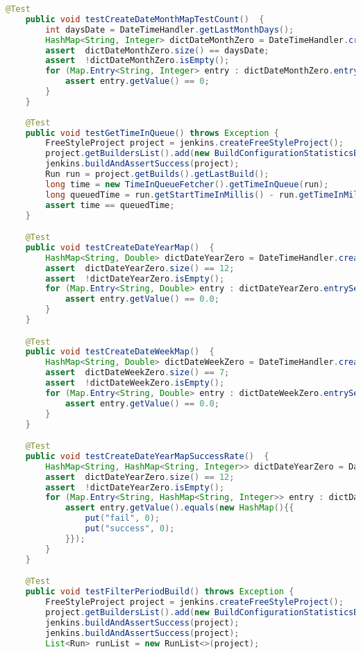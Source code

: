 \begin{lstlisting}[language=Java]
    @Test
    public void testCreateDateMonthMapTestCount()  {
        int daysDate = DateTimeHandler.getLastMonthDays();
        HashMap<String, Integer> dictDateMonthZero = DateTimeHandler.createDateMonthMapTestCount();
        assert  dictDateMonthZero.size() == daysDate;
        assert  !dictDateMonthZero.isEmpty();
        for (Map.Entry<String, Integer> entry : dictDateMonthZero.entrySet()) {
            assert entry.getValue() == 0;
        }
    }
    
    @Test
    public void testGetTimeInQueue() throws Exception {
        FreeStyleProject project = jenkins.createFreeStyleProject();
        project.getBuildersList().add(new BuildConfigurationStatisticsBuilder());
        jenkins.buildAndAssertSuccess(project);
        Run run = project.getBuilds().getLastBuild();
        long time = new TimeInQueueFetcher().getTimeInQueue(run);
        long queuedTime = run.getStartTimeInMillis() - run.getTimeInMillis();
        assert time == queuedTime;
    }

    @Test
    public void testCreateDateYearMap()  {
        HashMap<String, Double> dictDateYearZero = DateTimeHandler.createDateYearMap();
        assert  dictDateYearZero.size() == 12;
        assert  !dictDateYearZero.isEmpty();
        for (Map.Entry<String, Double> entry : dictDateYearZero.entrySet()) {
            assert entry.getValue() == 0.0;
        }
    }

    @Test
    public void testCreateDateWeekMap()  {
        HashMap<String, Double> dictDateWeekZero = DateTimeHandler.createDateWeekMap();
        assert  dictDateWeekZero.size() == 7;
        assert  !dictDateWeekZero.isEmpty();
        for (Map.Entry<String, Double> entry : dictDateWeekZero.entrySet()) {
            assert entry.getValue() == 0.0;
        }
    }

    @Test
    public void testCreateDateYearMapSuccessRate()  {
        HashMap<String, HashMap<String, Integer>> dictDateYearZero = DateTimeHandler.createDateYearMapSuccessRate();
        assert  dictDateYearZero.size() == 12;
        assert  !dictDateYearZero.isEmpty();
        for (Map.Entry<String, HashMap<String, Integer>> entry : dictDateYearZero.entrySet()) {
            assert entry.getValue().equals(new HashMap(){{
                put("fail", 0);
                put("success", 0);
            }});
        }
    }

    @Test
    public void testFilterPeriodBuild() throws Exception {
        FreeStyleProject project = jenkins.createFreeStyleProject();
        project.getBuildersList().add(new BuildConfigurationStatisticsBuilder());
        jenkins.buildAndAssertSuccess(project);
        jenkins.buildAndAssertSuccess(project);
        List<Run> runList = new RunList<>(project);


\end{lstlisting}
